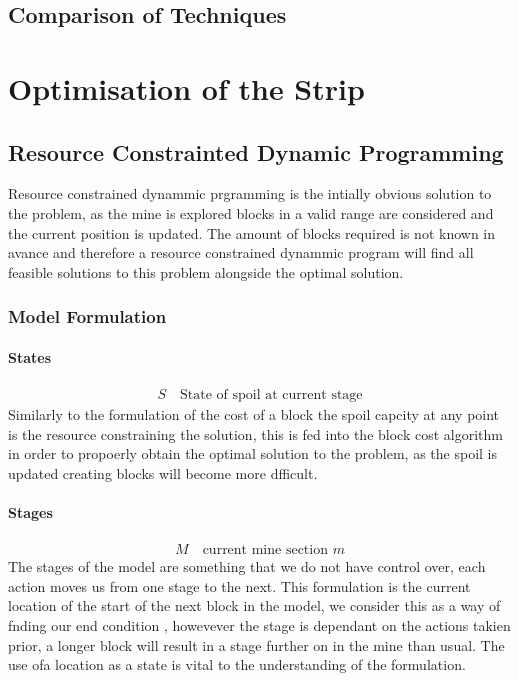 \subsection{Comparison of Techniques}

\section{Optimisation of the Strip}
\subsection{Resource Constrainted Dynamic Programming}
Resource constrained dynammic prgramming is the intially obvious solution to the problem, as the mine is explored blocks in a valid range are considered and the current position is updated. The amount of blocks required is not known in avance and therefore a resource constrained dynammic program will find all feasible solutions to this problem alongside the optimal solution. 
\subsubsection{Model Formulation}
\paragraph*{States}
\begin{align}
\label{Stte}
S \quad \text{State of spoil at current stage}
\end{align}
Similarly to the formulation of the cost of a block the spoil capcity at any point is the resource constraining the solution, this is fed into the block cost algorithm in order to propoerly obtain the optimal solution to the problem, as the spoil is updated creating blocks will become more dfficult. 
\paragraph*{Stages}
\begin{align}
\label{DP:Stage0}
M \quad \text{current mine section }m 
\end{align}
The stages of the model are something that we do not have control over, each action moves us from one stage to the next. This formulation is the current location of the start of the next block in the model, we consider this as a way of fnding our end condition , howevever the stage is dependant on the actions takien prior, a longer block will result in a stage further on in the mine than usual. The use ofa location as a state is vital to the understanding of the formulation. 
